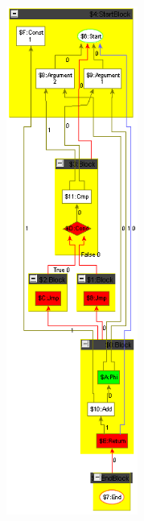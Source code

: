 \begin{figure}[htbp]
	\begin{minipage}[c]{0.4\textwidth}
		\centering
		\includegraphics[width=1.7in]{fig/MinPlus.png}
	\end{minipage}
%
	\begin{minipage}[c]{0.6\textwidth}
		\centering

\end{minipage}
\end{figure}
